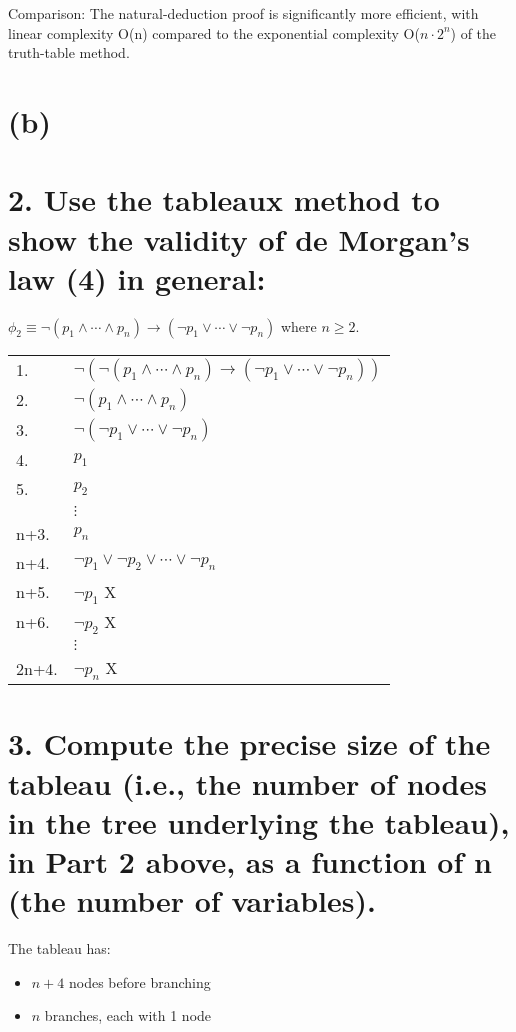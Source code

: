 \documentclass{article}
\begin{document}
Comparison: The natural-deduction proof is significantly more efficient, with linear complexity O(n) compared to the exponential complexity O($n \cdot 2^n$) of the truth-table method.

\newpage

\section*{(b)}

\section*{2. Use the tableaux method to show the validity of de Morgan's law (4) in general:}

$\phi_2 \equiv \neg(p_1 \wedge \cdots \wedge p_n) \to (\neg p_1 \vee \cdots \vee \neg p_n)$ where $n \geq 2$.

\begin{tabular}{l l}
1. & $\neg(\neg(p_1 \wedge \cdots \wedge p_n) \to (\neg p_1 \vee \cdots \vee \neg p_n))$ \\
2. & $\neg(p_1 \wedge \cdots \wedge p_n)$ \\
3. & $\neg(\neg p_1 \vee \cdots \vee \neg p_n)$ \\
4. & $p_1$ \\
5. & $p_2$ \\
   & $\vdots$ \\
n+3. & $p_n$ \\
n+4. & $\neg p_1 \vee \neg p_2 \vee \cdots \vee \neg p_n$ \\
\hline
n+5. & $\neg p_1$ \quad X \\
n+6. & $\neg p_2$ \quad X \\
     & $\vdots$ \\
2n+4. & $\neg p_n$ \quad X \\
\end{tabular}

\newpage

\section*{3. Compute the precise size of the tableau (i.e., the number of nodes in the tree underlying the tableau), in Part 2 above, as a function of n (the number of variables).}

The tableau has:
\begin{itemize}
    \item $n+4$ nodes before branching
    \item $n$ branches, each with 1 node
\end{itemize}
\end{document}
